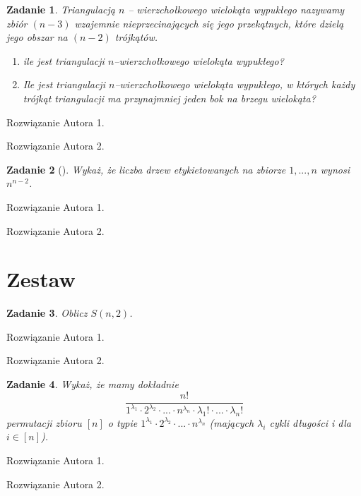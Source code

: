 \documentclass{mwart}
\newtheorem{zad}{Zadanie}[section]
\begin{document}
\begin{zad}
    Triangulacją $n$ -- wierzchołkowego wielokąta wypukłego nazywamy zbiór
    $(n - 3)$ wzajemnie nieprzecinających się jego przekątnych, które dzielą jego obszar na
    $(n - 2)$ trójkątów.
    \begin{enumerate}
        \item ile jest triangulacji $n$--wierzchołkowego wielokąta wypukłego?
        \item Ile jest triangulacji $n$--wierzchołkowego wielokąta wypukłego, w których każdy trójkąt
              triangulacji ma przynajmniej jeden bok na brzegu wielokąta?
    \end{enumerate}
\end{zad}
\begin{mdframed}
    Rozwiązanie Autora 1.
\end{mdframed}
\begin{mdframed}
    Rozwiązanie Autora 2.
\end{mdframed}




\begin{zad}[]
    Wykaż, że liczba drzew etykietowanych na zbiorze ${1, ..., n}$ wynosi $n^{n-2}$.
\end{zad}
\begin{mdframed}
    Rozwiązanie Autora 1.
\end{mdframed}
\begin{mdframed}
    Rozwiązanie Autora 2.
\end{mdframed}





\newpage
\section{Zestaw}          %

\begin{zad}
    Oblicz $S(n, 2)$.
\end{zad}
\begin{mdframed}
    Rozwiązanie Autora 1.
\end{mdframed}
\begin{mdframed}
    Rozwiązanie Autora 2.
\end{mdframed}




\begin{zad}
    Wykaż, że mamy dokładnie
    \[\frac{n!}{1^{\lambda_1} \cdot 2^{\lambda_2} \cdot  ... \cdot n^{\lambda_n} \cdot \lambda_1! \cdot ... \cdot \lambda_n!}\]
    permutacji zbioru $[n]$ o typie $1^{\lambda_1} \cdot 2^{\lambda_2} \cdot ... \cdot n^{\lambda_n} $  (mających $\lambda_i$ cykli długości i dla $i \in [n]$).
\end{zad}
\begin{mdframed}
    Rozwiązanie Autora 1.
\end{mdframed}
\begin{mdframed}
    Rozwiązanie Autora 2.
\end{mdframed}
\end{document}
